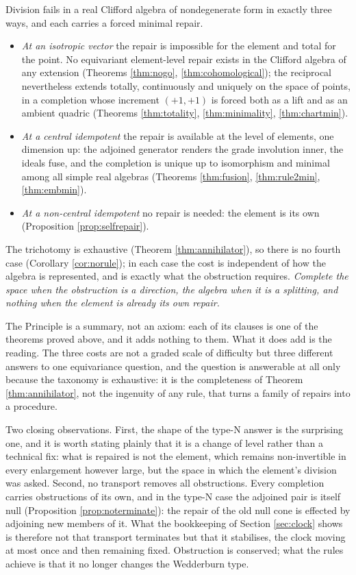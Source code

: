 \begin{principle}\label{pri:transport}
Division fails in a real Clifford algebra of nondegenerate form in exactly three ways, and each carries a forced minimal repair.
\begin{itemize}
\item \emph{At an isotropic vector} the repair is impossible for the element and total for the point. No equivariant element-level repair exists in the Clifford algebra of any extension (Theorems \ref{thm:nogo}, \ref{thm:cohomological}); the reciprocal nevertheless extends totally, continuously and uniquely on the space of points, in a completion whose increment $(+1,+1)$ is forced both as a lift and as an ambient quadric (Theorems \ref{thm:totality}, \ref{thm:minimality}, \ref{thm:chartmin}).
\item \emph{At a central idempotent} the repair is available at the level of elements, one dimension up: the adjoined generator renders the grade involution inner, the ideals fuse, and the completion is unique up to isomorphism and minimal among all simple real algebras (Theorems \ref{thm:fusion}, \ref{thm:rule2min}, \ref{thm:embmin}).
\item \emph{At a non-central idempotent} no repair is needed: the element is its own (Proposition \ref{prop:selfrepair}).
\end{itemize}
The trichotomy is exhaustive (Theorem \ref{thm:annihilator}), so there is no fourth case (Corollary \ref{cor:norule}); in each case the cost is independent of how the algebra is represented, and is exactly what the obstruction requires. \emph{Complete the space when the obstruction is a direction, the algebra when it is a splitting, and nothing when the element is already its own repair.}
\end{principle}

The Principle is a summary, not an axiom: each of its clauses is one of the theorems proved above, and it adds nothing to them. What it does add is the reading. The three costs are not a graded scale of difficulty but three different answers to one equivariance question, and the question is answerable at all only because the taxonomy is exhaustive: it is the completeness of Theorem \ref{thm:annihilator}, not the ingenuity of any rule, that turns a family of repairs into a procedure.

Two closing observations. First, the shape of the type-N answer is the surprising one, and it is worth stating plainly that it is a change of level rather than a technical fix: what is repaired is not the element, which remains non-invertible in every enlargement however large, but the space in which the element's division was asked. Second, no transport removes all obstructions. Every completion carries obstructions of its own, and in the type-N case the adjoined pair is itself null (Proposition \ref{prop:noterminate}): the repair of the old null cone is effected by adjoining new members of it. What the bookkeeping of Section \ref{sec:clock} shows is therefore not that transport terminates but that it stabilises, the clock moving at most once and then remaining fixed. Obstruction is conserved; what the rules achieve is that it no longer changes the Wedderburn type.

